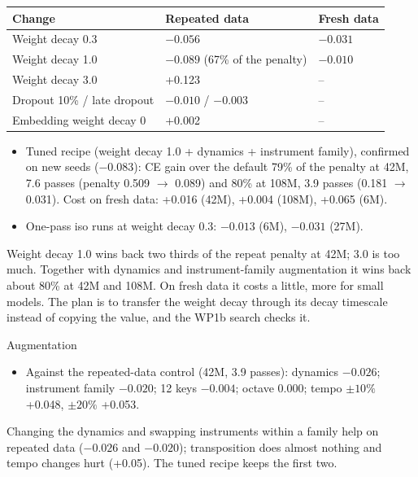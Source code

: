 \documentclass[11pt,a4paper]{article}
\makeatletter
\renewcommand\subsubsection{\@startsection{subsubsection}{3}{\z@}{-2.2ex \@plus -.5ex \@minus -.2ex}{0.8ex \@plus .2ex}%
  {\normalfont\normalsize\bfseries\color{head}}}
\makeatother
\begin{document}
\begin{tabularx}{\textwidth}{|L{4.6cm}|X|X|}
\hline
\textbf{Change} & \textbf{Repeated data} & \textbf{Fresh data}\\ \hline
Weight decay 0.3 & $-0.056$ & $-0.031$\\ \hline
Weight decay 1.0 & $-0.089$ (67\% of the penalty) & $-0.010$\\ \hline
Weight decay 3.0 & +0.123 & --\\ \hline
Dropout 10\% / late dropout & $-0.010$ / $-0.003$ & --\\ \hline
Embedding weight decay 0 & +0.002 & --\\ \hline
\end{tabularx}
\vspace{4pt}
\begin{itemize}
\item Tuned recipe (weight decay 1.0 + dynamics + instrument family), confirmed on new seeds ($-0.083$): CE gain over
the default 79\% of the penalty at 42M, 7.6 passes (penalty 0.509 $\to$ 0.089) and 80\% at 108M, 3.9 passes (0.181
$\to$ 0.031). Cost on fresh data:
+0.016 (42M), +0.004 (108M), +0.065 (6M).
\item One-pass iso runs at weight decay 0.3: $-0.013$ (6M), $-0.031$ (27M).
\end{itemize}
Weight decay 1.0 wins back two thirds of the repeat penalty at 42M; 3.0 is too much. Together with dynamics and
instrument-family augmentation it wins back about 80\% at 42M and 108M. On fresh data it costs a little, more for
small models. The plan is to transfer the weight decay through its decay timescale instead of copying the value,
and the WP1b search checks it.

\subsubsection{Augmentation}
\begin{itemize}
\item Against the repeated-data control (42M, 3.9 passes): dynamics $-0.026$; instrument family $-0.020$; 12 keys
$-0.004$; octave 0.000; tempo $\pm10\%$ +0.048, $\pm20\%$ +0.053.
\end{itemize}
Changing the dynamics and swapping instruments within a family help on repeated data ($-0.026$ and $-0.020$);
transposition does almost nothing and tempo changes hurt (+0.05). The tuned recipe keeps the first two.
\end{document}
